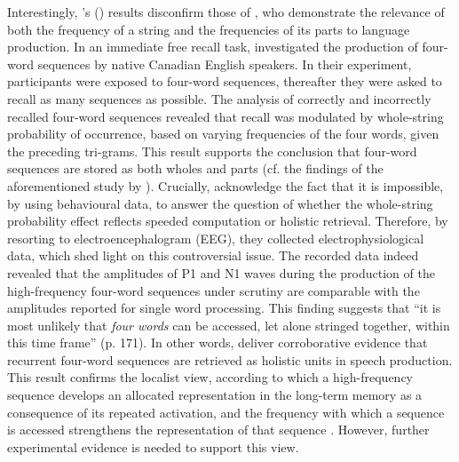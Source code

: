 Interestingly, \citeauthor{janssen-barber}'s (\citeyear{janssen-barber}) results disconfirm those of \citet{tremblay-baayen}, who demonstrate the relevance of both the frequency of a string and the frequencies of its parts to language production. In an immediate free recall task, \citet{tremblay-baayen} investigated the production of four-word sequences by native Canadian English speakers. In their experiment, participants were exposed to four-word sequences, thereafter they were asked to recall as many sequences as possible. The analysis of correctly and incorrectly recalled four-word sequences revealed that recall was modulated by whole-string probability of occurrence, based on varying frequencies of the four words, given the preceding tri-grams. This result supports the conclusion that four-word sequences are stored as both wholes and parts (cf. the findings of the aforementioned study by \citealt{kapatsinski-radicke}). Crucially, \citeauthor{tremblay-baayen} acknowledge the fact that it is impossible, by using behavioural data, to answer the question of whether the whole-string probability effect reflects speeded computation or holistic retrieval. Therefore, by resorting to electroencephalogram (EEG), they collected electrophysiological data, which shed light on this controversial issue. The recorded data indeed revealed that the amplitudes of P1 and N1 waves during the production of the high-frequency four-word sequences under scrutiny are comparable with the amplitudes reported for single word processing. This finding suggests that ``it is most unlikely that \textit{four words} can be accessed, let alone stringed together, within this time frame'' (p. 171). In other words, \citeauthor{tremblay-baayen} deliver corroborative evidence that recurrent four-word sequences are retrieved as holistic units in speech production. This result confirms the localist view, according to which a high-frequency sequence develops an allocated representation in the long-term memory as a consequence of its repeated activation, and the frequency with which a sequence is accessed strengthens the representation of that sequence \citep[cf.][]{bybee-book-2010,hay-2001,reali-christiansen,siyanova-etal}. However, further experimental evidence is needed to support this view.


